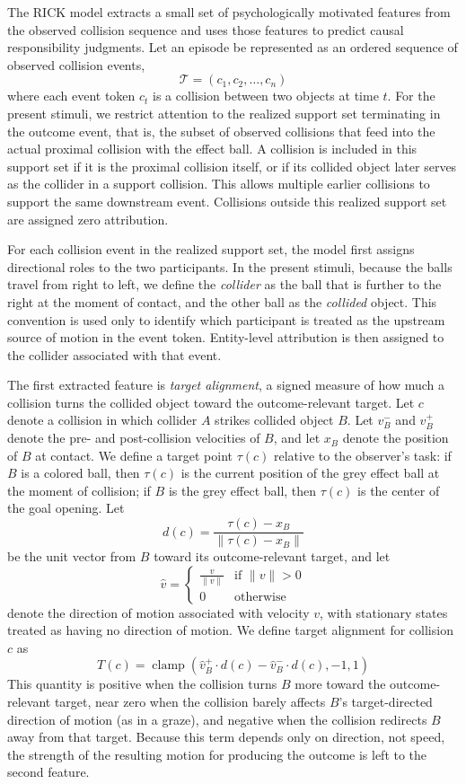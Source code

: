 \documentclass[10pt,letterpaper]{article}
\begin{document}
The RICK model extracts a small set of psychologically motivated features from the observed collision sequence and uses those features to predict causal responsibility judgments. Let an episode be represented as an ordered sequence of observed collision events,
\[
\mathcal{T} = (c_1, c_2, \ldots, c_n)
\]
where each event token $c_t$ is a collision between two objects at time $t$. For the present stimuli, we restrict attention to the realized support set terminating in the outcome event, that is, the subset of observed collisions that feed into the actual proximal collision with the effect ball. A collision is included in this support set if it is the proximal collision itself, or if its collided object later serves as the collider in a support collision. This allows multiple earlier collisions to support the same downstream event. Collisions outside this realized support set are assigned zero attribution.

For each collision event in the realized support set, the model first assigns directional roles to the two participants. In the present stimuli, because the balls travel from right to left, we define the \textit{collider} as the ball that is further to the right at the moment of contact, and the other ball as the \textit{collided} object. This convention is used only to identify which participant is treated as the upstream source of motion in the event token. Entity-level attribution is then assigned to the collider associated with that event.

The first extracted feature is \textit{target alignment}, a signed measure of how much a collision turns the collided object toward the outcome-relevant target. Let $c$ denote a collision in which collider $A$ strikes collided object $B$. Let $v_B^-$ and $v_B^+$ denote the pre- and post-collision velocities of $B$, and let $x_B$ denote the position of $B$ at contact. We define a target point $\tau(c)$ relative to the observer's task: if $B$ is a colored ball, then $\tau(c)$ is the current position of the grey effect ball at the moment of collision; if $B$ is the grey effect ball, then $\tau(c)$ is the center of the goal opening. Let
\[
d(c) = \frac{\tau(c) - x_B}{\|\tau(c) - x_B\|}
\]
be the unit vector from $B$ toward its outcome-relevant target, and let
\[
\widehat{v}=
\begin{cases}
\frac{v}{\|v\|} & \text{if } \|v\| > 0 \\
0 & \text{otherwise}
\end{cases}
\]
denote the direction of motion associated with velocity $v$, with stationary states treated as having no direction of motion. We define target alignment for collision $c$ as
\[
T(c) = \operatorname{clamp}\left(\hat{v}_B^+\cdot d(c) - \hat{v}_B^-\cdot d(c), -1, 1\right)
\]
This quantity is positive when the collision turns $B$ more toward the outcome-relevant target, near zero when the collision barely affects $B$'s target-directed direction of motion (as in a graze), and negative when the collision redirects $B$ away from that target. Because this term depends only on direction, not speed, the strength of the resulting motion for producing the outcome is left to the second feature.
\end{document}
